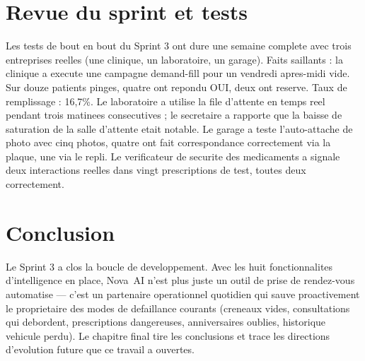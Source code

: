 \section{Revue du sprint et tests}
Les tests de bout en bout du Sprint 3 ont dure une semaine complete
avec trois entreprises reelles (une clinique, un laboratoire, un
garage). Faits saillants : la clinique a execute une campagne
demand-fill pour un vendredi apres-midi vide. Sur douze patients
pinges, quatre ont repondu OUI, deux ont reserve. Taux de remplissage :
16,7\%. Le laboratoire a utilise la file d'attente en temps reel
pendant trois matinees consecutives ; le secretaire a rapporte que la
baisse de saturation de la salle d'attente etait notable. Le garage a
teste l'auto-attache de photo avec cinq photos, quatre ont fait
correspondance correctement via la plaque, une via le repli. Le
verificateur de securite des medicaments a signale deux interactions
reelles dans vingt prescriptions de test, toutes deux correctement.

\section{Conclusion}
Le Sprint 3 a clos la boucle de developpement. Avec les huit
fonctionnalites d'intelligence en place, Nova~AI n'est plus juste un
outil de prise de rendez-vous automatise --- c'est un partenaire
operationnel quotidien qui sauve proactivement le proprietaire des
modes de defaillance courants (creneaux vides, consultations qui
debordent, prescriptions dangereuses, anniversaires oublies, historique
vehicule perdu). Le chapitre final tire les conclusions et trace les
directions d'evolution future que ce travail a ouvertes.
